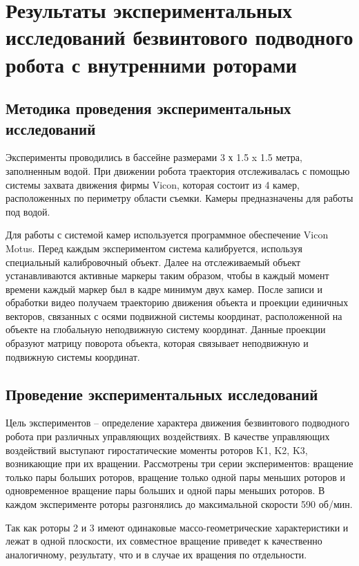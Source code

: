 \chapter{Результаты экспериментальных исследований безвинтового подводного робота с внутренними роторами}\label{ch:ch4}

\section{Методика проведения экспериментальных исследований}\label{sec:ch4/sec1}

Эксперименты проводились в бассейне размерами 3 х 1.5 x 1.5 метра, заполненным водой. При движении робота траектория отслеживалась с помощью системы захвата движения фирмы Vicon, которая состоит из 4 камер, расположенных по периметру области съемки. Камеры предназначены для работы под водой. 

Для работы с системой камер используется программное обеспечение Vicon Motus. Перед каждым экспериментом система калибруется, используя специальный калибровочный объект. Далее на отслеживаемый объект устанавливаются активные маркеры таким образом, чтобы в каждый момент времени каждый маркер был в кадре минимум двух камер. После записи и обработки видео получаем траекторию движения объекта и проекции единичных векторов, связанных с осями подвижной системы координат, расположенной на объекте на глобальную неподвижную систему координат. Данные проекции образуют матрицу поворота объекта, которая связывает неподвижную и подвижную системы координат.

\section{Проведение экспериментальных исследований}\label{subsec:ch4/sec2/sub1}

Цель экспериментов -- определение характера движения безвинтового подводного робота при различных управляющих воздействиях. В качестве управляющих воздействий выступают гиростатические моменты роторов K1, K2, K3, возникающие при их вращении. Рассмотрены три серии экспериментов: вращение только пары больших роторов, вращение только одной пары меньших роторов и одновременное вращение пары больших и одной пары меньших роторов. В каждом эксперименте роторы разгонялись до максимальной скорости 590 об/мин.

Так как роторы 2 и 3 имеют одинаковые массо-геометрические характеристики и лежат в одной плоскости, их совместное вращение приведет к качественно аналогичному, результату, что и в случае их вращения по отдельности.


